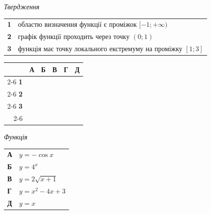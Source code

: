 \documentclass[14pt]{extarticle}
\begin{document}
\vspace{0.3cm}

\noindent
\begin{minipage}[t]{0.50\textwidth} %
    \textit{Твердження} \par \vspace{0.2cm}
    \begin{tabular}{@{}p{0.5cm} p{6.5cm}@{}}
    \textbf{1} & областю визначення функції є проміжок $[-1; +\infty)$ \\
    \textbf{2} & графік функції проходить через точку $(0; 1)$ \\
    \textbf{3} & функція має точку локального екстремуму на проміжку $[1; 3]$ \\
    \end{tabular}
    
    \vspace{0.3cm}
    
    \begingroup
    \setlength{\tabcolsep}{4pt}
    \renewcommand{\arraystretch}{1.2}
    \small
    \begin{tabular}{r|c|c|c|c|c|}
         \multicolumn{1}{c}{} & \multicolumn{1}{c}{\textbf{А}} & \multicolumn{1}{c}{\textbf{Б}} & \multicolumn{1}{c}{\textbf{В}} & \multicolumn{1}{c}{\textbf{Г}} & \multicolumn{1}{c}{\textbf{Д}} \\ \cline{2-6}
         \textbf{1} & & & & & \\ \cline{2-6}
         \textbf{2} & & & & & \\ \cline{2-6}
         \textbf{3} & & & & & \\ \cline{2-6}
    \end{tabular}
    \endgroup
\end{minipage}%
\hfill
\begin{minipage}[t]{0.45\textwidth}
    \textit{Функція} \par \vspace{0.2cm}
    \begin{tabular}{ll}
    \textbf{А} & $y = -\cos x$ \\[0.2cm]
    \textbf{Б} & $y = 4^x$ \\[0.2cm]
    \textbf{В} & $y = 2\sqrt{x+1}$ \\[0.2cm]
    \textbf{Г} & $y = x^2 - 4x + 3$ \\[0.2cm]
    \textbf{Д} & $y = x$ \\
    \end{tabular}
\end{minipage}
\end{document}
